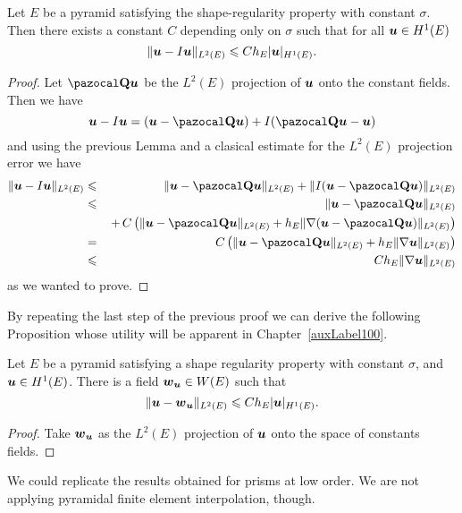 \begin{proposition}\label{propErrorInterpolacionPiramidesTetraedros}
Let $E$ be a pyramid satisfying the shape-regularity property with constant $\sigma$.
Then there exists a constant $C$ depending only on $\sigma$ such that 
for all $\boldsymbol{u}\in H^1(E)$
\[
\|\boldsymbol{u}-I\boldsymbol{u}\|_{L^2(E)}\leqslant C h_E|\boldsymbol{u}|_{H^1(E)}.
\]
\end{proposition}
\begin{proof} Let $\Qbb\bu$ be the $L^2(E)$ projection of $\boldsymbol{u}$ onto the 
constant fields. Then we have
\[
\bu-I\bu = (\bu - \Qbb\bu) + I(\Qbb\bu-\bu)
\]
and using the previous Lemma and a clasical estimate for the $L^2(E)$ projection
error we have
\begin{eqnarray*}
  \|\bu-I\bu\|_{L^2(E)} &\leqslant& \|\bu - \Qbb\bu\|_{L^2(E)} + 
    \|I(\bu-\Qbb\bu)\|_{L^2(E)}\\ 
  &\leqslant& \|\bu - \Qbb\bu\|_{L^2(E)}\\
  &&\, + \, C \left(\|\bu-\Qbb\bu\|_{L^2(E)} + 
  h_E\|\nabla(\bu-\Qbb\bu)\|_{L^2(E)}\right)\\ 
  & = & C\left(\|\bu-\Qbb\bu\|_{L^2(E)} + h_E\|\nabla\bu\|_{L^2(E)}\right)\\
  & \leqslant & C h_E \|\nabla\bu\|_{L^2(E)}
\end{eqnarray*}
as we wanted to prove.
\end{proof} 
By repeating the last step of the previous proof we can derive the following Proposition
whose utility will be apparent in Chapter~\ref{auxLabel100}.
\begin{proposition}\label{propupi}
Let $E$ be a pyramid satisfying a shape regularity property with constant 
$\sigma$, and $\boldsymbol{u}\in H^1(E)$. 
There is a field $\boldsymbol{w}_{\boldsymbol{u}}\in W(E)$ such that
\[
  \|\boldsymbol{u}-\boldsymbol{w}_{\boldsymbol{u}}\|_{L^2(E)} \leqslant C h_E |\boldsymbol{u}|_{H^1(E)}.
\]
\end{proposition}
\begin{proof}
Take $\boldsymbol{w}_{\boldsymbol{u}}$
as the $L^2(E)$ projection of $\boldsymbol{u}$ onto the space of constants fields.
\end{proof}
\begin{remark}
  We could replicate the results obtained for prisms at low order. We are not
  applying pyramidal finite element interpolation, though.
\end{remark}